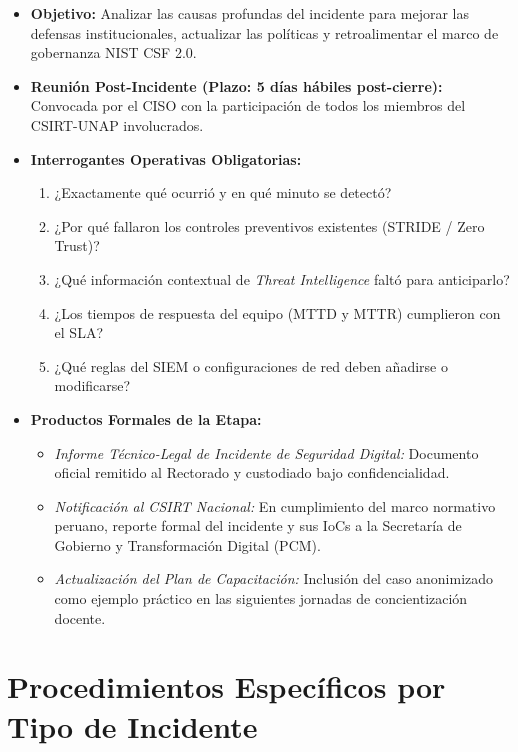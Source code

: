 \begin{itemize}
    \item \textbf{Objetivo:} Analizar las causas profundas del incidente para mejorar las defensas institucionales, actualizar las políticas y retroalimentar el marco de gobernanza NIST CSF 2.0.
    \item \textbf{Reunión Post-Incidente (Plazo: 5 días hábiles post-cierre):} Convocada por el CISO con la participación de todos los miembros del CSIRT-UNAP involucrados.
    \item \textbf{Interrogantes Operativas Obligatorias:}
    \begin{enumerate}
        \item ¿Exactamente qué ocurrió y en qué minuto se detectó?
        \item ¿Por qué fallaron los controles preventivos existentes (STRIDE / Zero Trust)?
        \item ¿Qué información contextual de \textit{Threat Intelligence} faltó para anticiparlo?
        \item ¿Los tiempos de respuesta del equipo (MTTD y MTTR) cumplieron con el SLA?
        \item ¿Qué reglas del SIEM o configuraciones de red deben añadirse o modificarse?
    \end{enumerate}
    \item \textbf{Productos Formales de la Etapa:}
    \begin{itemize}
        \item \textit{Informe Técnico-Legal de Incidente de Seguridad Digital:} Documento oficial remitido al Rectorado y custodiado bajo confidencialidad.
        \item \textit{Notificación al CSIRT Nacional:} En cumplimiento del marco normativo peruano, reporte formal del incidente y sus IoCs a la Secretaría de Gobierno y Transformación Digital (PCM).
        \item \textit{Actualización del Plan de Capacitación:} Inclusión del caso anonimizado como ejemplo práctico en las siguientes jornadas de concientización docente.
    \end{itemize}
\end{itemize}

\section{Procedimientos Específicos por Tipo de Incidente}

